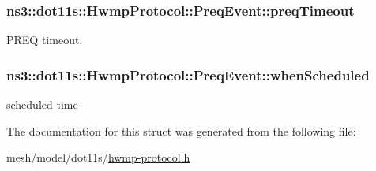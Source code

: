 \subsubsection[{\texorpdfstring{preq\+Timeout}{preqTimeout}}]{ ns3\+::dot11s\+::\+Hwmp\+Protocol\+::\+Preq\+Event\+::preq\+Timeout}\hypertarget{structns3_1_1dot11s_1_1HwmpProtocol_1_1PreqEvent_ad31ca9c3bed08b8a0818350b6681c342}{}\label{structns3_1_1dot11s_1_1HwmpProtocol_1_1PreqEvent_ad31ca9c3bed08b8a0818350b6681c342}


P\+R\+EQ timeout. 

\subsubsection[{\texorpdfstring{when\+Scheduled}{whenScheduled}}]{ ns3\+::dot11s\+::\+Hwmp\+Protocol\+::\+Preq\+Event\+::when\+Scheduled}\hypertarget{structns3_1_1dot11s_1_1HwmpProtocol_1_1PreqEvent_aeac1e9e975279f5bd8762bceafe1b2c2}{}\label{structns3_1_1dot11s_1_1HwmpProtocol_1_1PreqEvent_aeac1e9e975279f5bd8762bceafe1b2c2}


scheduled time 



The documentation for this struct was generated from the following file\+:\begin{DoxyCompactItemize}
\item 
mesh/model/dot11s/\hyperlink{hwmp-protocol_8h}{hwmp-\/protocol.\+h}\end{DoxyCompactItemize}
